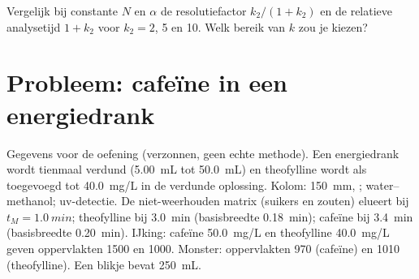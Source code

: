 \begin{exercise}[$\star\star\star$]\label{exo:b2:chromatography:12}
Vergelijk bij constante $N$ en $\alpha$ de resolutiefactor $k_2/(1+k_2)$ en de relatieve analysetijd
$1 + k_2$ voor $k_2 = 2$, 5 en 10. Welk bereik van $k$ zou je kiezen?
\end{exercise}

\section{Probleem: cafeïne in een energiedrank}

\begin{problem}
\label{pb:b2:chromatography:1}
Gegevens voor de oefening (verzonnen, geen echte methode). Een energiedrank wordt tienmaal verdund (\qty{5.00}{mL} tot
\qty{50.0}{mL}) en theofylline wordt als  toegevoegd tot \qty{40.0}{mg/L} in de verdunde
oplossing. Kolom: \qty{150}{mm}, ;  water--methanol; uv-detectie. De
niet-weerhouden matrix (suikers en zouten) elueert bij $t_M = \qty{1.0}{min}$; theofylline bij
\qty{3.0}{min} (basisbreedte \qty{0.18}{min}); cafeïne bij \qty{3.4}{min} (basisbreedte \qty{0.20}{min}).
IJking: cafeïne \qty{50.0}{mg/L} en theofylline \qty{40.0}{mg/L} geven oppervlakten 1500 en 1000.
Monster: oppervlakten 970 (cafeïne) en 1010 (theofylline). Een blikje bevat \qty{250}{mL}.

\begin{center}
\end{center}


\end{problem}
